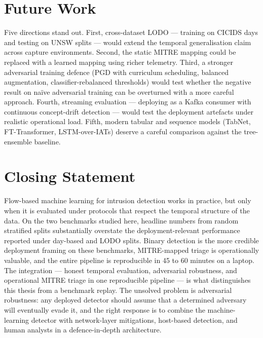 \section{Future Work}

Five directions stand out. First, cross-dataset LODO --- training on
CICIDS days and testing on UNSW splits --- would extend the temporal
generalisation claim across capture environments. Second, the static
MITRE mapping could be replaced with a learned mapping using richer
telemetry. Third, a stronger adversarial training defence (PGD with
curriculum scheduling, balanced augmentation, classifier-rebalanced
thresholds) would test whether the negative result on naïve adversarial
training can be overturned with a more careful approach. Fourth,
streaming evaluation --- deploying as a Kafka consumer with continuous
concept-drift detection --- would test the deployment artefacts under
realistic operational load. Fifth, modern tabular and sequence models
(TabNet, FT-Transformer, LSTM-over-IATs) deserve a careful comparison
against the tree-ensemble baseline.

\section{Closing Statement}

Flow-based machine learning for intrusion detection works in practice,
but only when it is evaluated under protocols that respect the temporal
structure of the data. On the two benchmarks studied here, headline
numbers from random stratified splits substantially overstate the
deployment-relevant performance reported under day-based and LODO
splits. Binary detection is the more credible deployment framing on
these benchmarks, MITRE-mapped triage is operationally valuable, and
the entire pipeline is reproducible in 45 to 60 minutes on a laptop.
The integration --- honest temporal evaluation, adversarial robustness,
and operational MITRE triage in one reproducible pipeline --- is what
distinguishes this thesis from a benchmark replay. The unsolved problem
is adversarial robustness: any deployed detector should assume that a
determined adversary will eventually evade it, and the right response is
to combine the machine-learning detector with network-layer mitigations,
host-based detection, and human analysts in a defence-in-depth
architecture.
